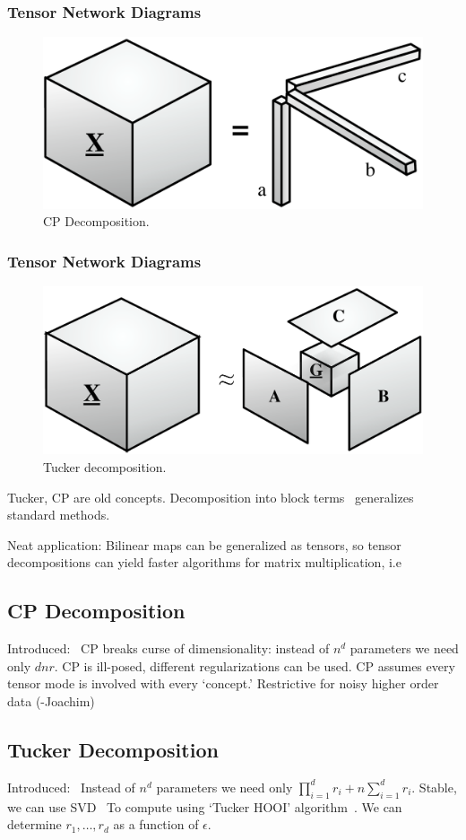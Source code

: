 \subsubsection{Tensor Network Diagrams}
\begin{figure}
  \centering\includegraphics[width=0.5\linewidth]{figs/cpdecomp}
  \caption{CP Decomposition.}
  \label{fig:cpdecomp}
\end{figure}

\subsubsection{Tensor Network Diagrams}
\begin{figure}
  \centering\includegraphics[width=0.55\linewidth]{figs/tdecomp}
  \caption{Tucker decomposition.}
  \label{fig:tdecomp}
\end{figure}

Tucker, CP are old concepts. Decomposition into block terms~\cite{Lathauwer08decompositionsof} generalizes standard methods.

Neat application: Bilinear maps can be generalized as tensors, so tensor decompositions can yield faster algorithms for matrix multiplication, i.e~\cite{Benson}

\subsection{CP Decomposition}
Introduced:~\cite{hitchcock-sum-1927}
CP breaks curse of dimensionality: instead of $n^d$ parameters we need only $dnr$.
CP is ill-posed, different regularizations can be used.
CP assumes every tensor mode is involved with every `concept.' Restrictive for noisy higher order data (-Joachim)
\subsection{Tucker Decomposition}
Introduced:~\cite{Tuck1966c}
Instead of $n^d$ parameters we need only $\prod_{i=1}^d r_i + n\sum_{i=1}^d r_i$.
Stable, we can use SVD~\cite{Lathauwer00amultilinear} To compute using `Tucker HOOI' algorithm~\cite{Lathauwer-THOOI}.
We can determine $r_1, \dots, r_d$ as a function of $\epsilon$.

